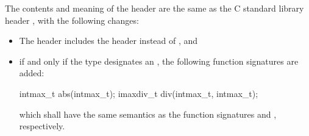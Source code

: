\pnum
The contents and meaning of the header 
are the same as the C standard library header ,
with the following changes:
\begin{itemize}
\item
The header  includes the header  instead
of , and
\item
if and only if the type  designates an
, the following function signatures are added:
\begin{codeblock}
intmax_t abs(intmax_t);
imaxdiv_t div(intmax_t, intmax_t);
\end{codeblock}
which shall have the same semantics as the function signatures
 and
, respectively.
\end{itemize}

